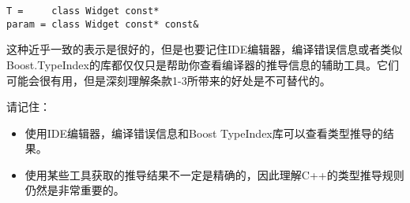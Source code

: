 \begin{lstlisting}
T =		class Widget const*
param =	class Widget const* const& 
\end{lstlisting}

这种近乎一致的表示是很好的，但是也要记住IDE编辑器，编译错误信息或者类似Boost.TypeIndex的库都仅仅只是帮助你查看编译器的推导信息的辅助工具。它们可能会很有用，但是深刻理解条款1-3所带来的好处是不可替代的。

\begin{mdframed}
请记住：
\begin{itemize}
\item{使用IDE编辑器，编译错误信息和Boost TypeIndex库可以查看类型推导的结果。}
\item{使用某些工具获取的推导结果不一定是精确的，因此理解C++的类型推导规则仍然是非常重要的。}
\end{itemize}
\end{mdframed}
























